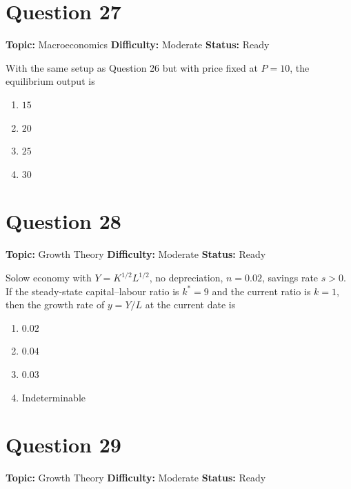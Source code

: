 \documentclass[11pt]{article}
\begin{document}
\newpage

\section*{Question 27}


\noindent\textbf{Topic:} Macroeconomics \quad \textbf{Difficulty:} Moderate \quad \textbf{Status:} Ready



With the same setup as Question 26 but with price fixed at $P = 10$,
the equilibrium output is
\begin{enumerate}[label=(\Alph*)]
\item $15$ \item $20$ \item $25$ \item $30$
\end{enumerate}

\newpage

\section*{Question 28}


\noindent\textbf{Topic:} Growth Theory \quad \textbf{Difficulty:} Moderate \quad \textbf{Status:} Ready



Solow economy with $Y = K^{1/2} L^{1/2}$, no depreciation, $n = 0.02$, savings
rate $s > 0$. If the steady-state capital--labour ratio is $k^* = 9$ and the
current ratio is $k = 1$, then the growth rate of $y = Y/L$ at the current date
is
\begin{enumerate}[label=(\Alph*)]
\item $0.02$ \item $0.04$ \item $0.03$ \item Indeterminable
\end{enumerate}

\newpage

\section*{Question 29}


\noindent\textbf{Topic:} Growth Theory \quad \textbf{Difficulty:} Moderate \quad \textbf{Status:} Ready
\end{document}
